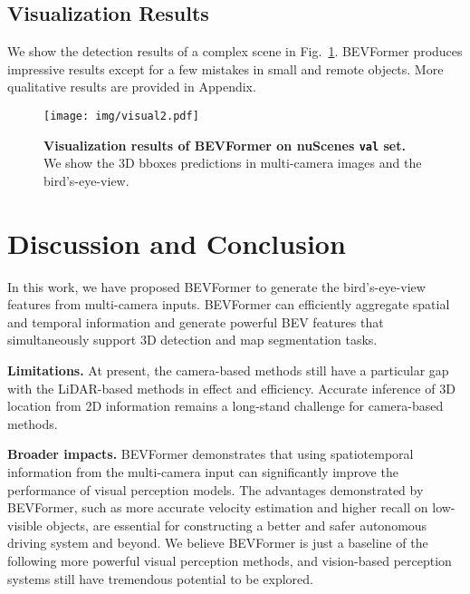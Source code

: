 \documentclass{article}
\begin{document}
\subsection{Visualization Results}


We show the detection results of a complex scene in Fig.~\ref{fig:vis}. BEVFormer produces impressive results except for a few mistakes in small and remote objects. More qualitative results are provided in Appendix.


\begin{figure}[t]
\centering
\texttt{[image: img/visual2.pdf]}
\caption{\textbf{Visualization results of BEVFormer on nuScenes \texttt{val} set.} We show the 3D bboxes predictions in multi-camera images and the bird's-eye-view. 
}
\label{fig:vis}

\end{figure}



\section{Discussion and Conclusion}

In this work, we have proposed BEVFormer to generate the bird's-eye-view features from multi-camera inputs. BEVFormer can efficiently aggregate spatial and temporal information and generate powerful BEV features that simultaneously support 3D detection and map segmentation tasks. 

\noindent\textbf{Limitations.} At present, the camera-based methods still have a particular gap with the LiDAR-based methods in effect and efficiency. Accurate inference of 3D location from 2D information remains a long-stand challenge for camera-based methods. 

\noindent\textbf{Broader impacts.}
BEVFormer demonstrates that using spatiotemporal information from the multi-camera input can significantly improve the performance of visual perception models.  The advantages demonstrated by BEVFormer, such as more accurate velocity estimation and higher recall on low-visible objects, are essential for constructing a better and safer autonomous driving system and beyond. We  believe BEVFormer is just a baseline of the following more powerful visual perception methods, and vision-based perception systems still have  tremendous potential to be explored. 





\clearpage
\end{document}
